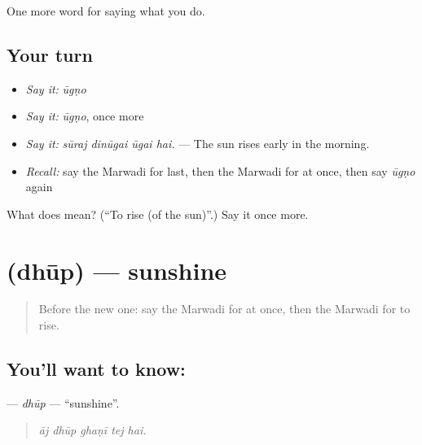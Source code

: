 \begin{grammarlens}[title={What you've built}]
One more word for saying what you do.
\end{grammarlens}

\subsection*{Your turn}
\begin{itemize}
\raggedright
  \item \emph{Say it:} \emph{ūgṇo}
  \item \emph{Say it:} \emph{ūgṇo}, once more
  \item \emph{Say it:} \emph{sūraj dinūgai ūgai hai.} — The sun rises early in the morning.
  \item \emph{Recall:} say the Marwadi for last, then the Marwadi for at once, then say \emph{ūgṇo} again
\end{itemize}

\begin{tcolorbox}[breakable,colback=teal!4,colframe=teal!35!black,title={Before you move on}]
What does  mean? (\textquotedblleft{}To rise (of the sun)\textquotedblright{}.) Say it once more.
\end{tcolorbox}
\section[\texorpdfstring{\mw{धूप} (dhūp)}{धूप (dhūp)}]{ (dhūp) — sunshine}

\label{lesson:MW-C168-dhup}



\begin{quote}
Before the new one: say the Marwadi for at once, then the Marwadi for to rise.
\end{quote}

\subsection*{You'll want to know: }
\textbf{} — \emph{dhūp} — \textquotedblleft{}sunshine\textquotedblright{}.

\begin{quote}
    
\end{quote}

\begin{quote}
\emph{āj dhūp ghaṇī tej hai.}
\end{quote}

